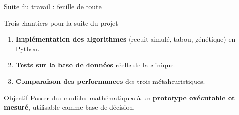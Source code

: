 
\begin{frame}{Suite du travail : feuille de route}
  \begin{block}{Trois chantiers pour la suite du projet}
    \begin{enumerate}
      \item \textbf{Implémentation des algorithmes} (recuit simulé, tabou,
      génétique) en Python.
      \item \textbf{Tests sur la base de données} réelle de la clinique.
      \item \textbf{Comparaison des performances} des trois métaheuristiques.
    \end{enumerate}
  \end{block}
  \vspace{0.2em}
  \begin{center}
  \end{center}
  \begin{alertblock}{\footnotesize Objectif}
    \footnotesize Passer des modèles mathématiques à un \textbf{prototype
    exécutable et mesuré}, utilisable comme base de décision.
  \end{alertblock}
\end{frame}

